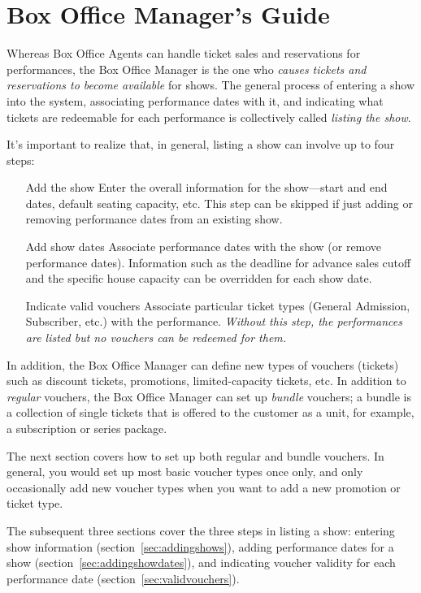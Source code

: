 
\section{Box Office Manager's Guide}
\label{chap:bom}

Whereas Box Office Agents can handle ticket sales and reservations for
performances, the Box Office Manager is the one who \emph{causes tickets
  and reservations to become available} for shows.  The general process
of entering a show into the system, associating performance dates with
it, and indicating what tickets are redeemable for each performance is
collectively called \emph{listing the show}.

It's important to realize that, in general, listing a show can involve
up to four steps:

\begin{enumerate}
\item[Add the show] Enter the overall information for the show---start
  and end dates, default seating capacity, etc.  This step can be
  skipped if just adding or removing performance dates from an existing
  show. 
\item[Add show dates] Associate performance dates with the show (or
  remove performance dates).  Information such as the deadline for
  advance sales cutoff and the specific house capacity can be overridden
  for each show date.
\item[Indicate valid vouchers] Associate particular ticket types
  (General Admission, Subscriber, etc.) with the performance.
  \emph{Without this step, the performances are listed but no vouchers
    can be redeemed for them.}
\end{enumerate}

In addition, the Box Office Manager can define new types of vouchers
(tickets) such as discount tickets, promotions, limited-capacity
tickets, etc.  In addition to \emph{regular} vouchers, the Box Office
Manager can set up \emph{bundle} vouchers; a bundle is a collection of
single tickets that is offered to the customer as a unit, for example, a
subscription or series package.

The next section covers how to set up both regular and bundle vouchers.
In general, you would set up most basic voucher types once only, and
only occasionally add new voucher types when you want to add a new
promotion or ticket type.

The subsequent three sections cover the three steps in listing a show:
entering show information (section~\ref{sec:addingshows}), adding
performance dates for a show (section~\ref{sec:addingshowdates}), and
indicating voucher validity for each performance date
(section~\ref{sec:validvouchers}).  

